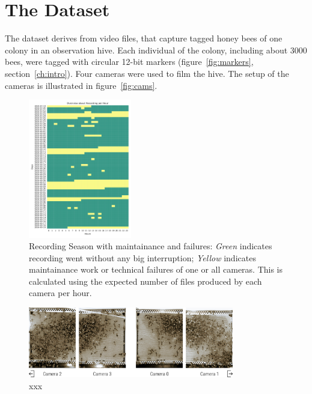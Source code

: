 \section{The Dataset}
\label{sec:dataset}
The dataset derives from video files, that capture tagged honey bees of one colony in an observation hive.
Each individual of the colony, including about 3000 bees, were tagged with circular 12-bit markers (figure~\ref{fig:markers}, section~\ref{ch:intro}). Four cameras were used to film the hive. The setup of the cameras is illustrated in figure~\ref{fig:cams}.

\begin{figure}[htb]
	\centering
	\includegraphics[width=0.4\textwidth]{Figures/recording}
	\caption[Recording Season]{Recording Season with maintainance and failures: \emph{Green} indicates recording went without any big interruption; \emph{Yellow} indicates maintainance work or technical failures of one or all cameras. This is calculated using the expected number of files produced by each camera per hour.}
	\label{fig:period}
\end{figure}

\begin{figure}[htb]
	\centering
	\includegraphics[width=0.8\textwidth]{Figures/beesClose}
	\caption[xxx]{xxx}
	\label{fig:veryclose}
\end{figure}


